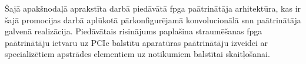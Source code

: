Šajā apakšnodaļā aprakstīta darbā \cite{lielamurs2026} piedāvātā \Gls{fpga} paātrinātāja arhitektūra, kas ir šajā promocijas
darbā aplūkotā pārkonfigurējamā konvolucionālā \Gls{snn} paātrinātāja galvenā realizācija. Piedāvātais risinājums paplašina
straumēšanas \Gls{fpga} paātrinātāju ietvaru uz PCIe balstītu aparatūras paātrinātāju izveidei ar specializētiem apstrādes
elementiem uz notikumiem balstītai skaitļošanai.
